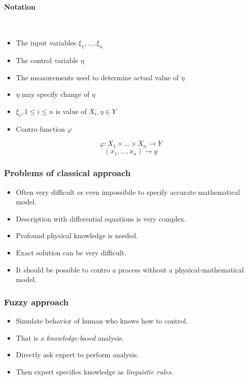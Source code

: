 \documentclass{article}
\begin{document}
\paragraph{Notation}\mbox{}\\
\begin{itemize}
    \item The input variables $\xi_1,\dots,\xi_n$
    \item The control variable $\eta$
    \item The measurements used to determine actual value of $\eta$
    \item $\eta$ may specify change of $\eta$
    \item $\xi_i, 1\leq i\leq n$ is value of $X_i,\eta\in Y$
    \item Contro function $\varphi$
\end{itemize}
$$\varphi: X_1\times\dots\times X_n\rightarrow Y$$
$$(x_1,\dots,x_n)\rightarrow y$$

\subsubsection{Problems of classical approach}
\begin{itemize}
    \item Often very difficult or even impossibile to specify accurate mathematical model.
    \item Description with differential equations is very complex.
    \item Profound physical knowledge is needed.
    \item Exact solution can be very difficult.
    \item It should be possible to contro a process without a physical-mathematical model.
\end{itemize}

\subsubsection{Fuzzy approach}
\begin{itemize}
    \item Simulate behavior of human who knows how to control.
    \item That is a \textit{knowledge-based} analysis.
    \item Directly ask expert to perform analysis.
    \item Then expert specifies knowledge as \textit{linguistic rules}.
\end{itemize}
\end{document}
